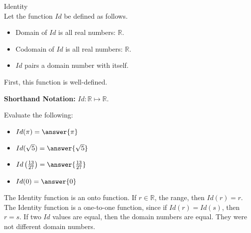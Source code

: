 \documentclass{ximera}
\begin{document}
\begin{example} Identity \\

Let the function $Id$ be defined as follows.


\begin{itemize}
\item Domain of $Id$ is all real numbers: $\mathbb{R}$.
\item Codomain of $Id$ is all real numbers: $\mathbb{R}$.
\item $Id$ pairs a domain number with itself.
\end{itemize}


First, this function is well-defined.


\textbf{Shorthand Notation: } $Id: \mathbb{R} \mapsto \mathbb{R}$.

\begin{question}
Evaluate the following:

\begin{itemize}
	\item $Id(\pi) = \answer{\pi}$
	\item $Id(\sqrt{5}) = \answer{\sqrt{5}}$
	\item $Id\left(\frac{13}{27}\right) = \answer{\frac{13}{27}}$
	\item $Id(0) = \answer{0}$
\end{itemize}

\end{question}





The Identity function is an onto function.  If $r \in \mathbb{R}$, the range, then $Id(r) = r$. \\


The Identity function is a one-to-one function, since if $Id(r)=Id(s)$, then $r = s$.  If two $Id$ values are equal, then the domain numbers are equal. They were not different domain numbers.





\end{example}
\end{document}
